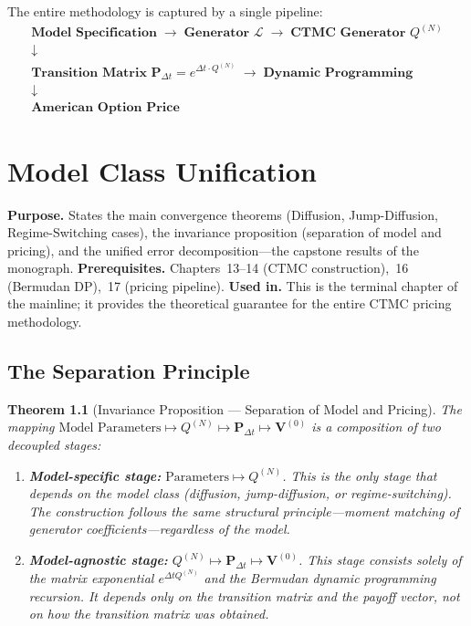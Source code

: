 \documentclass[11pt,a4paper,openany]{book}
\theoremstyle{definition}
\theoremstyle{plain}
\newtheorem{theorem}{Theorem}[chapter]
\theoremstyle{remark}
\newcommand{\1}{\mathbbm{1}}
\newcommand{\calL}{\mathcal{L}}
\begin{document}
The entire methodology is captured by a single pipeline:
\[
\boxed{
\begin{array}{c}
\textbf{Model Specification} \;\longrightarrow\; \textbf{Generator } \calL \;\longrightarrow\; \textbf{CTMC Generator } Q^{(N)} \\
\downarrow \\
\textbf{Transition Matrix } \mathbf{P}_{\Delta t} = e^{\Delta t \cdot Q^{(N)}} \;\longrightarrow\; \textbf{Dynamic Programming} \\
\downarrow \\
\textbf{American Option Price}
\end{array}
}
\]

\chapter{Model Class Unification}

\noindent\textbf{Purpose.} States the main convergence theorems (Diffusion, Jump-Diffusion, Regime-Switching cases), the invariance proposition (separation of model and pricing), and the unified error decomposition---the capstone results of the monograph.
\textbf{Prerequisites.} Chapters~13--14 (CTMC construction),~16 (Bermudan DP),~17 (pricing pipeline).
\textbf{Used in.} This is the terminal chapter of the mainline; it provides the theoretical guarantee for the entire CTMC pricing methodology.

\section{The Separation Principle}

\begin{theorem}[Invariance Proposition --- Separation of Model and Pricing]
The mapping $\text{Model Parameters} \mapsto Q^{(N)} \mapsto \mathbf{P}_{\Delta t} \mapsto \mathbf{V}^{(0)}$ is a composition of two decoupled stages:
\begin{enumerate}[label=(\arabic*)]
    \item \textbf{Model-specific stage:} $\text{Parameters} \mapsto Q^{(N)}$. This is the only stage that depends on the model class (diffusion, jump-diffusion, or regime-switching). The construction follows the same structural principle---moment matching of generator coefficients---regardless of the model.
    \item \textbf{Model-agnostic stage:} $Q^{(N)} \mapsto \mathbf{P}_{\Delta t} \mapsto \mathbf{V}^{(0)}$. This stage consists solely of the matrix exponential $e^{\Delta t Q^{(N)}}$ and the Bermudan dynamic programming recursion. It depends only on the transition matrix and the payoff vector, not on how the transition matrix was obtained.
\end{enumerate}
\end{theorem}
\end{document}
